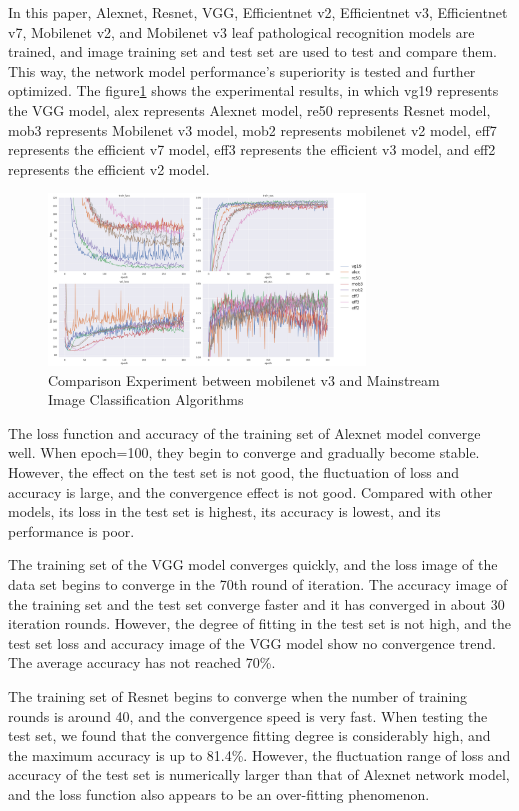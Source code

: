 \documentclass[a4paper,fleqn]{cas-sc}
\begin{document}
In this paper, Alexnet, Resnet, VGG, Efficientnet v2, Efficientnet v3, Efficientnet v7, Mobilenet v2, and Mobilenet v3 leaf pathological recognition models are trained, and image training set and test set are used to test and compare them. This way, the network model performance's superiority is tested and further optimized. The figure\ref{fig:f4} shows the experimental results, in which vg19 represents the VGG  model, alex represents Alexnet model, re50 represents Resnet model, mob3 represents Mobilenet v3 model, mob2 represents mobilenet v2 model, eff7 represents the efficient v7 model, eff3 represents the efficient v3 model, and eff2 represents the efficient v2 model. 
\begin{figure}
\centering
\includegraphics[width=0.75\textwidth]{figs_rev1/f4.png}
\caption{Comparison Experiment between mobilenet v3 and Mainstream Image Classification Algorithms}
\label{fig:f4}
\end{figure}

The loss function and accuracy of the training set of Alexnet model converge well. When epoch=100, they begin to converge and gradually become stable. However, the effect on the test set is not good, the fluctuation of loss and accuracy is large, and the convergence effect is not good. Compared with other models, its loss in the test set is highest, its accuracy is lowest, and its performance is poor. 

The training set of the VGG model converges quickly, and the loss image of the data set begins to converge in the 70th round of iteration. The accuracy image of the training set and the test set converge faster and it has converged in about 30 iteration rounds. However, the degree of fitting in the test set is not high, and the test set loss and accuracy image of the VGG model show no convergence trend. The average accuracy has not reached 70\%. 

The training set of Resnet begins to converge when the number of training rounds is around 40, and the convergence speed is very fast. When testing the test set, we found that the convergence fitting degree is considerably high, and the maximum accuracy is up to 81.4\%. However, the fluctuation range of loss and accuracy of the test set is numerically larger than that of Alexnet network model, and the loss function also appears to be an over-fitting phenomenon. 
\end{document}
